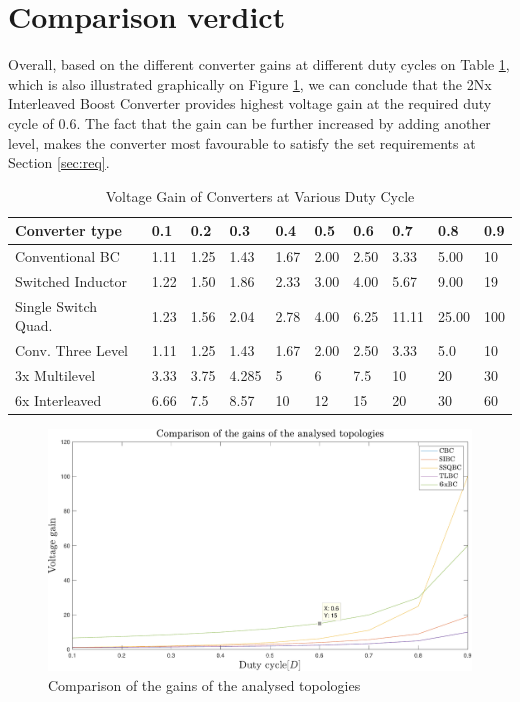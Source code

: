 \section{Comparison verdict}\label{ch:VERD}

Overall, based on the different converter gains at different duty cycles on Table \ref{tab:2NX_Overall}, which is also illustrated graphically on Figure \ref{fig:2Nx_Overall_Graph}, we can conclude that the 2Nx Interleaved Boost Converter provides highest voltage gain at the required duty cycle of 0.6. The fact that the gain can be further increased by adding another level, makes the converter most favourable to satisfy the set requirements at Section \ref{sec:req}. 

\begin{table}[H]
\begin{center}
\caption {Voltage Gain of Converters at Various Duty Cycle} \label{tab:2NX_Overall} 
\begin{tabular}{|l|l|l|l|l|l|l|l|l|l|}
\hline
\textbf{Converter type} & \textbf{0.1} & \textbf{0.2} & \textbf{0.3} & \textbf{0.4} & \textbf{0.5} & \textbf{0.6} & \textbf{0.7} & \textbf{0.8} & \textbf{0.9} \\ \hline
Conventional BC        &      1.11   &      1.25   &   1.43   &      1.67   &      2.00    &      2.50  &      3.33   &     5.00  &   10 \\ \hline
Switched Inductor   & 1.22      &      1.50   &      1.86   &      2.33   &     3.00    &     4.00    &      5.67     &    9.00   &      19\\ \hline
Single Switch Quad.        &       1.23     &      1.56      &      2.04   &      2.78   &      4.00   &      6.25   &      11.11   &      25.00   &      100 \\ \hline
Conv. Three Level          & 1.11   &      1.25   &   1.43   &      1.67   &      2.00    &      2.50  &      3.33   &     5.0  &   10\\ \hline
3x Multilevel         &     3.33       &      3.75   &     4.285   &      5   &      6   &      7.5   &      10   &      20   &      30   \\ \hline
6x Interleaved         &     6.66       &      7.5   &      8.57   &      10   &      12   &      15   &      20   &      30   &      60   \\ \hline
\end{tabular}
\end{center}
\end{table}

\begin{figure}[H]
   \centering
   \includegraphics[width=\textwidth]{figures/gains.pdf}
    \caption{Comparison of the gains of the analysed topologies}
	\label{fig:2Nx_Overall_Graph}
\end{figure}
\clearpage
